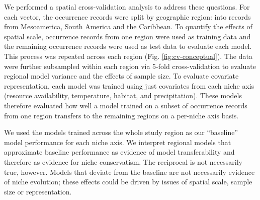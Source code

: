 We performed a spatial cross-validation analysis to address these questions. For each vector, the occurrence records were split by geographic region: into records from Mesoamerica, South America and the Caribbean. To quantify the effects of spatial scale, occurrence records from one region were used as training data and the remaining occurrence records were used as test data to evaluate each model. This process was repeated across each region (Fig. \ref{fig:cv-conceptual}). The data were further subsampled within each region via 5-fold cross-validation to evaluate regional model variance and the effects of sample size. To evaluate covariate representation, each model was trained using just covariates from each niche axis (resource availability, temperature, habitat, and precipitation). These models therefore evaluated how well a model trained on a subset of occurrence records from one region transfers to the remaining regions on a per-niche axis basis. 

We used the models trained across the whole study region as our “baseline” model performance for each niche axis. We interpret regional models that approximate baseline performance as evidence of model transferability and therefore as evidence for niche conservatism. The reciprocal is not necessarily true, however. Models that deviate from the baseline are not necessarily evidence of niche evolution; these effects could be driven by issues of spatial scale, sample size or representation.

\clearpage
